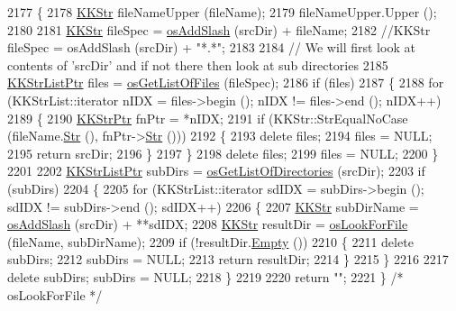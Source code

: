 \begin{DoxyCode}
2177 \{
2178   \hyperlink{class_k_k_b_1_1_k_k_str}{KKStr}  fileNameUpper (fileName);
2179   fileNameUpper.Upper ();
2180 
2181   \hyperlink{class_k_k_b_1_1_k_k_str}{KKStr}  fileSpec = \hyperlink{namespace_k_k_b_aa0d40119b911df4283399a1724cab1ef}{osAddSlash} (srcDir) + fileName;
2182   \textcolor{comment}{//KKStr  fileSpec = osAddSlash (srcDir) + "*.*";}
2183 
2184   \textcolor{comment}{// We will first look at contents of 'srcDir'  and if not there then look at sub directories}
2185   \hyperlink{class_k_k_b_1_1_k_k_str_list}{KKStrListPtr} files = \hyperlink{namespace_k_k_b_a47f37fe64afeebf0baffdf389148c3ba}{osGetListOfFiles} (fileSpec);
2186   \textcolor{keywordflow}{if}  (files)
2187   \{
2188     \textcolor{keywordflow}{for}  (KKStrList::iterator nIDX = files->begin ();  nIDX != files->end ();  nIDX++)
2189     \{
2190       \hyperlink{class_k_k_b_1_1_k_k_str}{KKStrPtr}  fnPtr = *nIDX;
2191       \textcolor{keywordflow}{if}  (KKStr::StrEqualNoCase (fileName.\hyperlink{class_k_k_b_1_1_k_k_str_ad574e6c0fe7f6ce1ba3ab0a8ce2fbd52}{Str} (), fnPtr->\hyperlink{class_k_k_b_1_1_k_k_str_ad574e6c0fe7f6ce1ba3ab0a8ce2fbd52}{Str} ()))
2192       \{
2193         \textcolor{keyword}{delete}  files;
2194         files = NULL;
2195         \textcolor{keywordflow}{return} srcDir;
2196       \}
2197     \}
2198     \textcolor{keyword}{delete}  files;
2199     files = NULL;
2200   \}
2201 
2202   \hyperlink{class_k_k_b_1_1_k_k_str_list}{KKStrListPtr}  subDirs = \hyperlink{namespace_k_k_b_a5a4fe85032282128eb06725d1f8e8b53}{osGetListOfDirectories} (srcDir);
2203   \textcolor{keywordflow}{if}  (subDirs)
2204   \{
2205     \textcolor{keywordflow}{for}  (KKStrList::iterator sdIDX = subDirs->begin ();  sdIDX != subDirs->end ();  sdIDX++)
2206     \{
2207       \hyperlink{class_k_k_b_1_1_k_k_str}{KKStr}  subDirName = \hyperlink{namespace_k_k_b_aa0d40119b911df4283399a1724cab1ef}{osAddSlash} (srcDir) + **sdIDX;
2208       \hyperlink{class_k_k_b_1_1_k_k_str}{KKStr}  resultDir = \hyperlink{namespace_k_k_b_af2c69fe9c1ecf3d518959933b22061e2}{osLookForFile} (fileName, subDirName);
2209       \textcolor{keywordflow}{if}  (!resultDir.\hyperlink{class_k_k_b_1_1_k_k_str_ac69942f73fffd672ec2a6e1c410afdb6}{Empty} ())
2210       \{
2211         \textcolor{keyword}{delete}  subDirs;
2212         subDirs = NULL;
2213         \textcolor{keywordflow}{return} resultDir;
2214       \}
2215     \}
2216 
2217     \textcolor{keyword}{delete}  subDirs;  subDirs = NULL;
2218   \}
2219 
2220   \textcolor{keywordflow}{return} \textcolor{stringliteral}{""};
2221 \}  \textcolor{comment}{/* osLookForFile */}
\end{DoxyCode}
